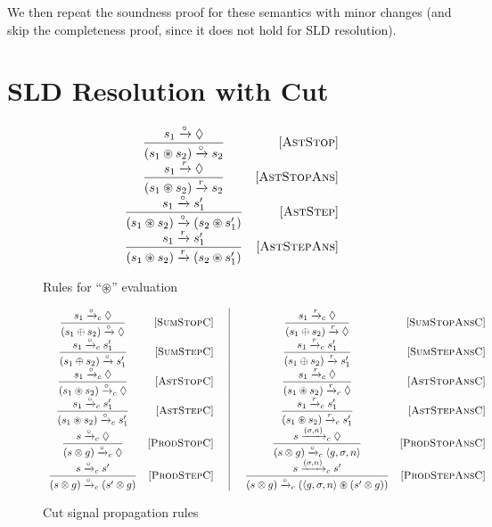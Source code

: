 We then repeat the soundness proof for these semantics with minor changes (and skip the completeness proof, since it does not hold for SLD resolution).

\section{SLD Resolution with Cut}
\label{appendix_cut}

\begin{figure*}[t]
\[
  \begin{array}{cr}
    \dfrac{s_1 \xrightarrow{\circ} \Diamond}{(s_1 \circledast s_2) \xrightarrow{\circ} s_2} & \mbox{[\textsc{AstStop}]}\\
    \dfrac{s_1 \xrightarrow{r} \Diamond}{(s_1 \circledast s_2) \xrightarrow{r} s_2} & \mbox{[\textsc{AstStopAns}]}\\
    \dfrac{s_1 \xrightarrow{\circ} s'_1}{(s_1 \circledast s_2) \xrightarrow{\circ} (s_2 \circledast s'_1)} &\mbox{[\textsc{AstStep}]}\\
    \dfrac{s_1 \xrightarrow{r} s'_1}{(s_1 \circledast s_2) \xrightarrow{r} (s_2 \circledast s'_1)} &\mbox{[\textsc{AstStepAns}]}\\
  \end{array}
\]
\caption{Rules for ``$\circledast$'' evaluation}
\label{asterisk-rules}
\end{figure*}

\begin{figure*}[t]
\[
\begin{array}{crc|ccr}
  \dfrac{s_1 \xrightarrow{\circ}_c \Diamond}{(s_1 \oplus s_2) \xrightarrow{\circ} \Diamond} & \mbox{[\textsc{SumStopC}]}& & &
  \dfrac{s_1 \xrightarrow{r}_c \Diamond}{(s_1 \oplus s_2) \xrightarrow{r} \Diamond} & \mbox{[\textsc{SumStopAnsC}]}\\
  \dfrac{s_1 \xrightarrow{\circ}_c s'_1}{(s_1 \oplus s_2) \xrightarrow{\circ} s'_1} &\mbox{[\textsc{SumStepC}]}& & &
  \dfrac{s_1 \xrightarrow{r}_c s'_1}{(s_1 \oplus s_2) \xrightarrow{r} s'_1} &\mbox{[\textsc{SumStepAnsC}]}\\
  \dfrac{s_1 \xrightarrow{\circ}_c \Diamond}{(s_1 \circledast s_2) \xrightarrow{\circ}_c \Diamond} & \mbox{[\textsc{AstStopC}]}& & &
  \dfrac{s_1 \xrightarrow{r}_c \Diamond}{(s_1 \circledast s_2) \xrightarrow{r}_c \Diamond} & \mbox{[\textsc{AstStopAnsC}]}\\
  \dfrac{s_1 \xrightarrow{\circ}_c s'_1}{(s_1 \circledast s_2) \xrightarrow{\circ}_c s'_1} &\mbox{[\textsc{AstStepC}]}& & &
  \dfrac{s_1 \xrightarrow{r}_c s'_1}{(s_1 \circledast s_2) \xrightarrow{r}_c s'_1} &\mbox{[\textsc{AstStepAnsC}]}\\
  \dfrac{s \xrightarrow{\circ}_c \Diamond}{(s \otimes g) \xrightarrow{\circ}_c \Diamond} & \mbox{[\textsc{ProdStopC}]}& & &
  \dfrac{s \xrightarrow{(\sigma, n)}_c \Diamond}{(s \otimes g) \xrightarrow{\circ}_c \left<{g, \sigma, n}\right>} & \mbox{[\textsc{ProdStopAnsC}]}\\
  \dfrac{s \xrightarrow{\circ}_c s'}{(s \otimes g) \xrightarrow{\circ}_c (s' \otimes g)} &\mbox{[\textsc{ProdStepC}]}& & &
  \dfrac{s \xrightarrow{(\sigma, n)}_c s'}{(s \otimes g) \xrightarrow{\circ}_c (\left<{g, \sigma, n}\right> \circledast (s' \otimes g))} &\mbox{[\textsc{ProdStepAnsC}]}
\end{array}
\]
\caption{Cut signal propagation rules}
\label{cut-signal-propagation}
\end{figure*}

